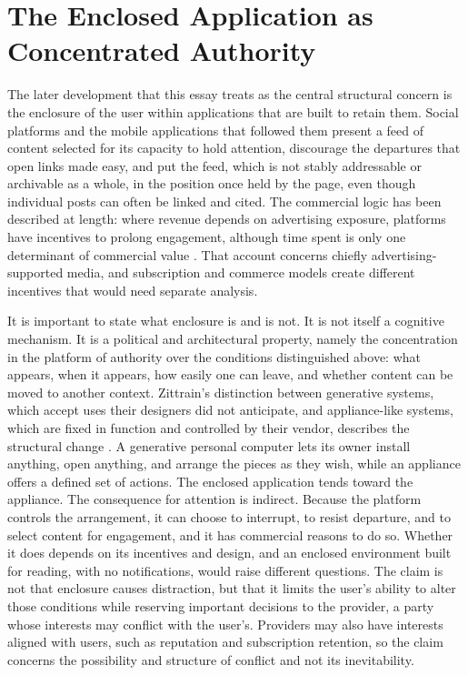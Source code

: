 \documentclass[12pt]{article}
\begin{document}
\section{The Enclosed Application as Concentrated Authority}

The later development that this essay treats as the central structural concern is the enclosure of the user within applications that are built to retain them. Social platforms and the mobile applications that followed them present a feed of content selected for its capacity to hold attention, discourage the departures that open links made easy, and put the feed, which is not stably addressable or archivable as a whole, in the position once held by the page, even though individual posts can often be linked and cited. The commercial logic has been described at length: where revenue depends on advertising exposure, platforms have incentives to prolong engagement, although time spent is only one determinant of commercial value \cite{wu2016attention}. That account concerns chiefly advertising-supported media, and subscription and commerce models create different incentives that would need separate analysis.

It is important to state what enclosure is and is not. It is not itself a cognitive mechanism. It is a political and architectural property, namely the concentration in the platform of authority over the conditions distinguished above: what appears, when it appears, how easily one can leave, and whether content can be moved to another context. Zittrain's distinction between generative systems, which accept uses their designers did not anticipate, and appliance-like systems, which are fixed in function and controlled by their vendor, describes the structural change \cite{zittrain2008future}. A generative personal computer lets its owner install anything, open anything, and arrange the pieces as they wish, while an appliance offers a defined set of actions. The enclosed application tends toward the appliance. The consequence for attention is indirect. Because the platform controls the arrangement, it can choose to interrupt, to resist departure, and to select content for engagement, and it has commercial reasons to do so. Whether it does depends on its incentives and design, and an enclosed environment built for reading, with no notifications, would raise different questions. The claim is not that enclosure causes distraction, but that it limits the user's ability to alter those conditions while reserving important decisions to the provider, a party whose interests may conflict with the user's. Providers may also have interests aligned with users, such as reputation and subscription retention, so the claim concerns the possibility and structure of conflict and not its inevitability.
\end{document}
